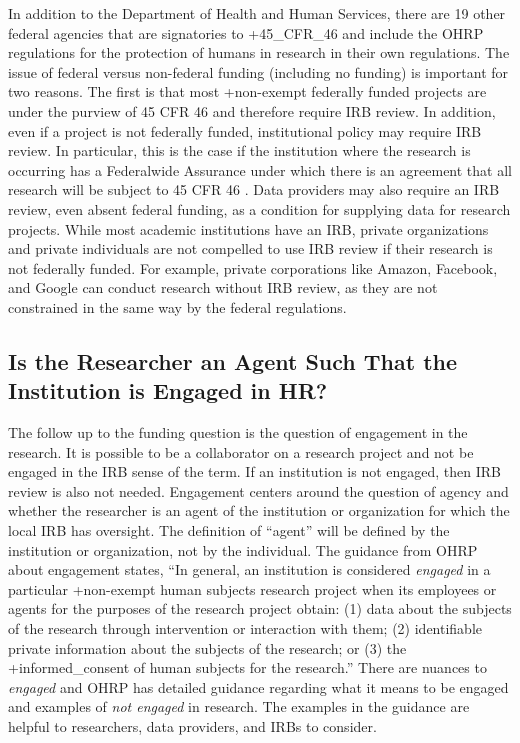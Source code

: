 \documentclass[
]{book}
\begin{document}
In addition to the Department of Health and Human Services, there are 19 other federal agencies that are signatories to +45\_CFR\_46\textbar{} and include the OHRP regulations for the protection of humans in research in their own regulations. The issue of federal versus non-federal funding (including no funding) is important for two reasons. The first is that most +non-exempt\textbar{} federally funded projects are under the purview of 45 CFR 46 and therefore require IRB review. In addition, even if a project is not federally funded, institutional policy may require IRB review. In particular, this is the case if the institution where the research is occurring has a Federalwide Assurance under which there is an agreement that all research will be subject to 45 CFR 46 \citep{officeforhumanresearchprotections2017}. Data providers may also require an IRB review, even absent federal funding, as a condition for supplying data for research projects. While most academic institutions have an IRB, private organizations and private individuals are not compelled to use IRB review if their research is not federally funded. For example, private corporations like Amazon, Facebook, and Google can conduct research without IRB review, as they are not constrained in the same way by the federal regulations.

\hypertarget{is-the-researcher-an-agent-such-that-the-institution-is-engaged-in-hr}{%
\subsection{Is the Researcher an Agent Such That the Institution is Engaged in HR?}\label{is-the-researcher-an-agent-such-that-the-institution-is-engaged-in-hr}}

The follow up to the funding question is the question of engagement in the research. It is possible to be a collaborator on a research project and not be engaged in the IRB sense of the term. If an institution is not engaged, then IRB review is also not needed. Engagement centers around the question of agency and whether the researcher is an agent of the institution or organization for which the local IRB has oversight. The definition of ``agent'' will be defined by the institution or organization, not by the individual. The guidance from OHRP about engagement states, ``In general, an institution is considered \emph{engaged} in a particular +non-exempt\textbar{} human subjects research project when its employees or agents for the purposes of the research project obtain: (1) data about the subjects of the research through intervention or interaction with them; (2) identifiable private information about the subjects of the research; or (3) the +informed\_consent\textbar{} of human subjects for the research.'' \citep{codeoffederalregulations2017b} There are nuances to \emph{engaged} and OHRP has detailed guidance regarding what it means to be engaged and examples of \emph{not engaged} in research. The examples in the guidance are helpful to researchers, data providers, and IRBs to consider.
\end{document}
